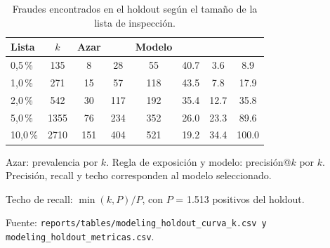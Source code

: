 \begin{table}[htbp]
  \centering
  \small
  \caption{Fraudes encontrados en el holdout según el tamaño de la lista de inspección.}
  \label{tab:curva-k}
  \begin{threeparttable}
    \begin{tabular}{l S[table-format=4.0] S[table-format=3.0] S[table-format=3.0] S[table-format=3.0] S[table-format=2.1] S[table-format=2.1] S[table-format=3.1]}
      \toprule
      {Lista} & {$k$} & {Azar} & {} & {Modelo} & {} & {} & {} \\
      ,5\,\% & 135 & 8 & 28 & 55 & 40.7 & 3.6 & 8.9 \\
      1,0\,\% & 271 & 15 & 57 & 118 & 43.5 & 7.8 & 17.9 \\
      2,0\,\% & 542 & 30 & 117 & 192 & 35.4 & 12.7 & 35.8 \\
      5,0\,\% & 1355 & 76 & 234 & 352 & 26.0 & 23.3 & 89.6 \\
      10,0\,\% & 2710 & 151 & 404 & 521 & 19.2 & 34.4 & 100.0 \\
      \bottomrule
    \end{tabular}
    \begin{tablenotes}
      \footnotesize
      \item Azar: prevalencia por $k$. Regla de exposición y modelo: precisión@$k$ por $k$. Precisión, recall y techo corresponden al modelo seleccionado.
      \item Techo de recall: $\min(k, P)/P$, con $P$ = 1.513 positivos del holdout.
      \item Fuente: \texttt{reports/tables/modeling\_holdout\_curva\_k.csv y modeling\_holdout\_metricas.csv}.
    \end{tablenotes}
  \end{threeparttable}
\end{table}
